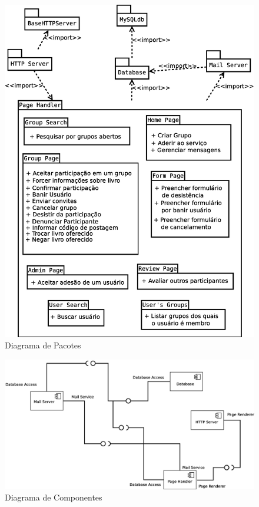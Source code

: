 \documentclass[a4paper]{article}
\title{}
\author{}
\date{}
\begin{document}
 \pagestyle{empty}
 \begin{figure}
  \includegraphics[totalheight=\textheight]{pacotes.eps}
  \caption{Diagrama de Pacotes}
 \end{figure}
 
 \begin{figure}
  \includegraphics[angle=90,totalheight=\textheight]{componentes.eps}
  \caption{Diagrama de Componentes}
 \end{figure}
 
\end{document}
